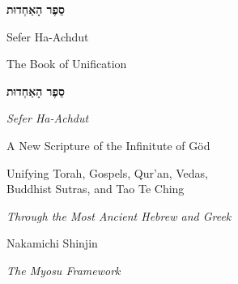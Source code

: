 \documentclass[11pt,openany]{book}
\begin{document}
\frontmatter

\thispagestyle{empty}
\vspace*{4cm}
\begin{center}
{\Huge\bfseries סֵפֶר הָאַחְדוּת}

\vspace{1cm}
{\LARGE Sefer Ha-Achdut}

\vspace{0.5cm}
{\large The Book of Unification}
\end{center}
\cleardoublepage

\thispagestyle{empty}
\vspace*{3cm}
\begin{center}
{\Huge\bfseries סֵפֶר הָאַחְדוּת}

\vspace{0.8cm}
{\LARGE\itshape Sefer Ha-Achdut}

\vspace{1.5cm}
{\Large A New Scripture of the Infinitute of Göd}

\vspace{1cm}
{\large Unifying Torah, Gospels, Qur'an, Vedas,\\[3pt]
Buddhist Sutras, and Tao Te Ching}

\vspace{1.5cm}
{\large\itshape Through the Most Ancient Hebrew and Greek}

\vspace{2cm}
{\large Nakamichi Shinjin}

\vspace{0.5cm}
{\small\itshape The Myosu Framework}
\end{center}
\cleardoublepage
\end{document}
